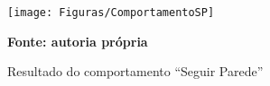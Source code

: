 \begin{figure}[!ht]
\centering
\caption{Resultado do comportamento ``Seguir Parede''}
\label{fig:resultadoImplementadoSP}
		\centering
		\texttt{[image: Figuras/ComportamentoSP]}%

	\textbf{Fonte: autoria própria}
\end{figure}